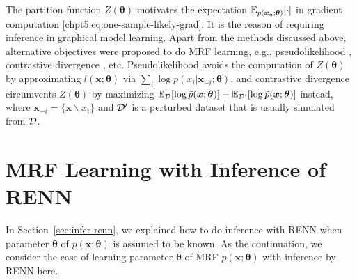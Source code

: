 \begin{remark}
  The partition function $Z(\bm{\theta})$ motivates the expectation $\mathbb{E}_{p(\bm{x}_a; \bm{\theta})}[\cdot]$ in gradient computation \eqref{chpt5:eq:one-sample-likely-grad}. It is the reason of requiring inference in graphical model learning. Apart from the methods discussed above, alternative objectives were proposed to do MRF learning, e.g., pseudolikelihood \cite[Section~20]{koller2009pgm}, contrastive divergence \cite{Hinton2012, carreiraperpinan2005contrastive}, etc. Pseudolikelihood avoids the computation of $Z(\bm{\theta})$ by approximating $l(\bm{x}; \bm{\theta})$ via $\sum_{i}\log{p(x_i|\bm{x}_{-i}; \bm{\theta})}$, and contrastive divergence circumvents $Z(\bm{\theta})$ by maximizing $\mathbb{E}_{\mathcal{D}}[\log{\tilde{p}(\bm{x}; \bm{\theta})}] - \mathbb{E}_{\mathcal{D}^{\prime}}[\log{\tilde{p}(\bm{x}; \bm{\theta})}]$ instead, where $\bm{x}_{-i} = \{\bm{x}\backslash x_i\}$ and $\mathcal{D}^{\prime}$ is a perturbed dataset that is usually simulated from $\mathcal{D}$.
\end{remark}

\section{MRF Learning with Inference of RENN}
\label{sec:model-learning-with-renn}
In Section~\ref{sec:infer-renn}, we explained how to do inference with RENN when parameter $\bm{\theta}$ of $p(\bm{x}; \bm{\theta})$ is assumed to be known. As the continuation, we consider the case of learning parameter $\bm{\theta}$ of MRF $p(\bm{x}; \bm{\theta})$ with inference by RENN here.

